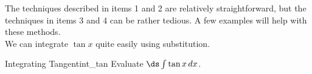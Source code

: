 %
%
%
%

The techniques described in items 1 and 2 are relatively straightforward, but the techniques in items 3 and 4 can be rather tedious. A few examples will help with these methods.\\


We can integrate $\tan x$ quite easily using substitution.\\

\begin{example}{Integrating Tangent}{int_tan}
Evaluate $\ds\int\tan x\,dx$.
\end{example}  

